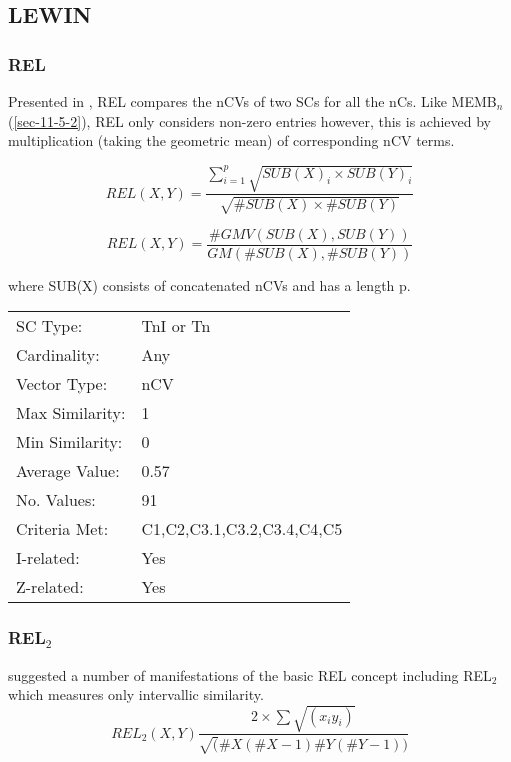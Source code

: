 \documentclass{article}
\begin{document}
\subsection{LEWIN}
\label{sec-11-7}
\subsubsection{REL}
\label{sec-11-7-1}

Presented in \citet{Lewin1979}, REL compares the nCVs of two SCs for
all the nCs. Like MEMB$_{n}$ (\ref{sec-11-5-2}), REL only considers non-zero
entries however, this is achieved by multiplication (taking the
geometric mean) of corresponding nCV terms.

$$REL(X,Y)=\frac{\sum_{i=1}^{p}{\sqrt{SUB(X)_{i}\times SUB(Y)_{i}}}}{\sqrt{\#SUB(X)\times \#SUB(Y)}}$$

$$REL(X,Y)=\frac{\#GMV(SUB(X),SUB(Y))}{GM(\#SUB(X),\#SUB(Y))}$$

where SUB(X) consists of concatenated nCVs and has a length p.

\begin{center}
\begin{tabular}{ll}
 SC Type:         &  TnI or Tn                   \\
 Cardinality:     &  Any                         \\
 Vector Type:     &  nCV                         \\
 Max Similarity:  &  1                           \\
 Min Similarity:  &  0                           \\
 Average Value:   &  0.57                        \\
 No. Values:      &  91                          \\
 Criteria Met:    &  C1,C2,C3.1,C3.2,C3.4,C4,C5  \\
 I-related:       &  Yes                         \\
 Z-related:       &  Yes                         \\
\end{tabular}
\end{center}
\subsubsection{REL$_{2}$}
\label{sec-11-7-2}

\citet{Rahn1979} suggested a number of manifestations of the basic REL
concept including REL$_{2}$ which measures only intervallic similarity.
$$ REL_{2}(X,Y)\frac{2\times\sum\sqrt{(x_{i}y_{i})}}{\sqrt(\#X(\#X-1)\#Y(\#Y-1))} $$
\end{document}
